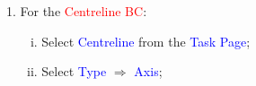 \documentclass[10pt,compress, unknownkeysallowed]{beamer}
\newcommand{\red}{\textcolor{red}}
\newcommand{\blue}{\textcolor{blue}}
\begin{document}
\begin{frame}
\begin{columns}
\begin{column}[l]{0.5\linewidth}
\begin{enumerate}
           \end{enumerate}
        \end{column}
           \begin{column}[l]{0.5\linewidth}
               \begin{enumerate}\scriptsize\setcounter{enumi}{12}
                   \item<5-> For the \red{Centreline BC}:
                       \begin{enumerate}[i)]\scriptsize
                          \item<5-> Select \blue{Centreline} from the \blue{Task Page};
                          \item<5-> Select \blue{Type} $\Rightarrow$ \blue{Axis};
                       \end{enumerate}
               \end{enumerate}
           \end{column}
    \end{columns}
\end{frame}
\end{document}
